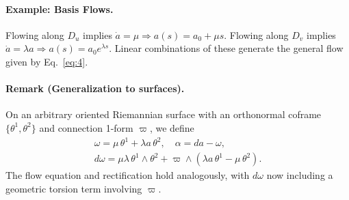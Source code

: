 \paragraph{Example: Basis Flows.}
Flowing along $D_u$ implies $\dot{a} = \mu \Rightarrow a(s) = a_0 + \mu s$. Flowing along $D_v$ implies $\dot{a} = \lambda a \Rightarrow a(s) = a_0 e^{\lambda s}$. Linear combinations of these generate the general flow given by Eq.~\eqref{eq:4}.

\paragraph{Remark (Generalization to surfaces).}
On an arbitrary oriented Riemannian surface with an orthonormal coframe $\{\theta^1, \theta^2\}$ and connection 1-form $\varpi$, we define
\begin{gather}
\omega=\mu\,\theta^1+\lambda a\,\theta^2, \quad \alpha=da-\omega, \label{eq:18} \tag{18-19} \\
d\omega=\mu\lambda\,\theta^1\wedge\theta^2+\varpi\wedge(\lambda a\,\theta^1-\mu\,\theta^2). \nonumber
\end{gather}
The flow equation and rectification hold analogously, with $d\omega$ now including a geometric torsion term involving $\varpi$.
